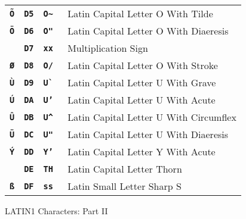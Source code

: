 \documentclass[12pt]{article}
\newcommand{\TT}[1]{{\tt \bfseries #1}}
\newlength{\figurewidth}
\newenvironment{boxedfigure}[1][!btp]%
	{\begin{figure*}[#1]
	 \begin{lrbox}{\figurebox}
	 \begin{minipage}{\figurewidth}

	 \vspace*{1ex}}%
	{
	 \vspace*{1ex}

	 \end{minipage}
	 \end{lrbox}

	 \vspace*{-15ex}
	 \centering
	 \fbox{\hspace*{0.1in}\usebox{\figurebox}\hspace*{0.1in}}
	 \end{figure*}}
\begin{document}
\begin{boxedfigure}[p]
\begin{tabular}{llll}
\TT{\~O}
  & \TT{D5} & \TT{O\textasciitilde} & Latin Capital Letter O With Tilde \\
\TT{\"O}
  & \TT{D6} & \TT{O"} & Latin Capital Letter O With Diaeresis \\
\TT{\texttimes}
  & \TT{D7} & \TT{xx} & Multiplication Sign \\
\TT{\O}
  & \TT{D8} & \TT{O/} & Latin Capital Letter O With Stroke \\
\TT{\`U}
  & \TT{D9} & \TT{U\`~} & Latin Capital Letter U With Grave \\
\TT{\'U}
  & \TT{DA} & \TT{U'} & Latin Capital Letter U With Acute \\
\TT{\^U}
  & \TT{DB} & \TT{U\textasciicircum} & Latin Capital Letter U With Circumflex \\
\TT{\"U}
  & \TT{DC} & \TT{U"} & Latin Capital Letter U With Diaeresis \\
\TT{\'Y}
  & \TT{DD} & \TT{Y'} & Latin Capital Letter Y With Acute \\
\TT{\TH}
  & \TT{DE} & \TT{TH} & Latin Capital Letter Thorn \\
\TT{\ss}
  & \TT{DF} & \TT{ss} & Latin Small Letter Sharp S \\
\end{tabular}
\caption{LATIN1 Characters: Part II}
\label{LATIN1-CHARACTERS-II}
\end{boxedfigure}
\end{document}
